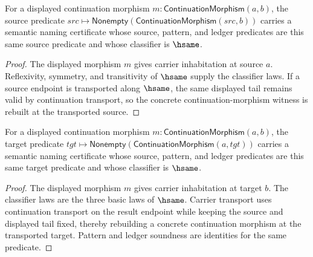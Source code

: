 \begin{theorem}
\label{thm:continuation-morphism-source-semantic-namecert}
For a displayed continuation morphism $m:\mathsf{ContinuationMorphism}(a,b)$,
the source predicate
$src\mapsto\mathsf{Nonempty}(\mathsf{ContinuationMorphism}(src,b))$
carries a semantic naming certificate whose source, pattern, and ledger
predicates are this same source predicate and whose classifier is $\hsame$.
\end{theorem}
\begin{proof}
The displayed morphism $m$ gives carrier inhabitation at source $a$.
Reflexivity, symmetry, and transitivity of $\hsame$ supply the classifier
laws. If a source endpoint is transported along $\hsame$, the same displayed
tail remains valid by continuation transport, so the concrete
continuation-morphism witness is rebuilt at the transported source.
\end{proof}

\begin{theorem}
\label{thm:continuation-morphism-target-semantic-namecert}
For a displayed continuation morphism $m:\mathsf{ContinuationMorphism}(a,b)$,
the target predicate
$tgt\mapsto\mathsf{Nonempty}(\mathsf{ContinuationMorphism}(a,tgt))$
carries a semantic naming certificate whose source, pattern, and ledger
predicates are this same target predicate and whose classifier is $\hsame$.
\end{theorem}
\begin{proof}
The displayed morphism $m$ gives carrier inhabitation at target $b$.
The classifier laws are the three basic laws of $\hsame$. Carrier transport
uses continuation transport on the result endpoint while keeping the source
and displayed tail fixed, thereby rebuilding a concrete continuation morphism
at the transported target. Pattern and ledger soundness are identities for the
same predicate.
\end{proof}


